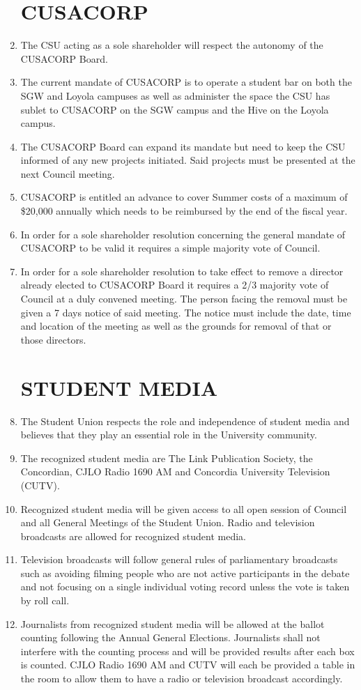 \documentclass[oneside]{book}
\begin{document}
\begin{enumerate}
\part{\label{CUSACORP}CUSACORP }
\item The CSU acting as a sole shareholder will respect the autonomy of
the CUSACORP Board. 
\item The current mandate of CUSACORP is to operate a student bar on both
the SGW and Loyola campuses as well as administer the space the CSU
has sublet to CUSACORP on the SGW campus and the Hive on the Loyola
campus. 
\item The CUSACORP Board can expand its mandate but need to keep the CSU
informed of any new projects initiated. Said projects must be presented
at the next Council meeting. 
\item CUSACORP is entitled an advance to cover Summer costs of a maximum
of \$20,000 annually which needs to be reimbursed by the end of the
fiscal year. 
\item In order for a sole shareholder resolution concerning the general
mandate of CUSACORP to be valid it requires a simple majority vote
of Council. 
\item In order for a sole shareholder resolution to take effect to remove
a director already elected to CUSACORP Board it requires a 2/3 majority
vote of Council at a duly convened meeting. The person facing the
removal must be given a 7 days notice of said meeting. The notice
must include the date, time and location of the meeting as well as
the grounds for removal of that or those directors. 

\part{\label{STUDENT_MEDIA}STUDENT MEDIA }
\item The Student Union respects the role and independence of student media
and believes that they play an essential role in the University community. 
\item The recognized student media are The Link Publication Society, the
Concordian, CJLO Radio 1690 AM and Concordia University Television
(CUTV). 
\item Recognized student media will be given access to all open session
of Council and all General Meetings of the Student Union. Radio and
television broadcasts are allowed for recognized student media. 
\item Television broadcasts will follow general rules of parliamentary broadcasts
such as avoiding filming people who are not active participants in
the debate and not focusing on a single individual voting record unless
the vote is taken by roll call. 
\item Journalists from recognized student media will be allowed at the ballot
counting following the Annual General Elections. Journalists shall
not interfere with the counting process and will be provided results
after each box is counted. CJLO Radio 1690 AM and CUTV will each be
provided a table in the room to allow them to have a radio or television
broadcast accordingly. 


\end{enumerate}
\end{document}
